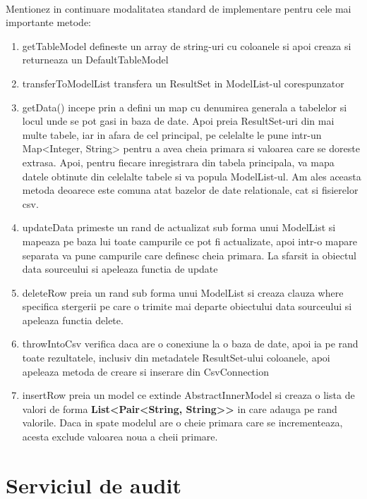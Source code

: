 \documentclass[oneside]{article}
\begin{document}
\paragraph{} Mentionez in continuare modalitatea standard de implementare pentru cele mai importante metode:
\begin{enumerate}
    \item getTableModel defineste un array de string-uri cu coloanele si apoi creaza si returneaza un DefaultTableModel
    \item transferToModelList transfera un ResultSet in ModelList-ul corespunzator
    \item getData() incepe prin a defini un map cu denumirea generala a tabelelor si locul unde se pot gasi in baza de date. Apoi preia ResultSet-uri din mai multe tabele, iar in afara de cel principal, pe celelalte le pune intr-un Map<Integer, String> pentru a avea cheia primara si valoarea care se doreste extrasa. Apoi, pentru fiecare inregistrara din tabela principala, va mapa datele obtinute din celelalte tabele si va popula ModelList-ul. Am ales aceasta metoda deoarece este comuna atat bazelor de date relationale, cat si fisierelor csv.
    \item updateData primeste un rand de actualizat sub forma unui ModelList si mapeaza pe baza lui toate campurile ce pot fi actualizate, apoi intr-o mapare separata va pune campurile care definesc cheia primara. La sfarsit ia obiectul data sourceului si apeleaza functia de update
    \item deleteRow preia un rand sub forma unui ModelList si creaza clauza where specifica stergerii pe care o trimite mai departe obiectului data sourceului si apeleaza functia delete.
    \item throwIntoCsv verifica daca are o conexiune la o baza de date, apoi ia pe rand toate rezultatele, inclusiv din metadatele ResultSet-ului coloanele, apoi apeleaza metoda de creare si inserare din CsvConnection
    \item insertRow preia un model ce extinde AbstractInnerModel si creaza o lista de valori de forma \textbf{List<Pair<String, String>{}>} in care adauga pe rand valorile. Daca in spate modelul are o cheie primara care se incrementeaza, acesta exclude valoarea noua a cheii primare.
\end{enumerate}

\section[Serviciul de audit]{Serviciul de audit}
\end{document}
